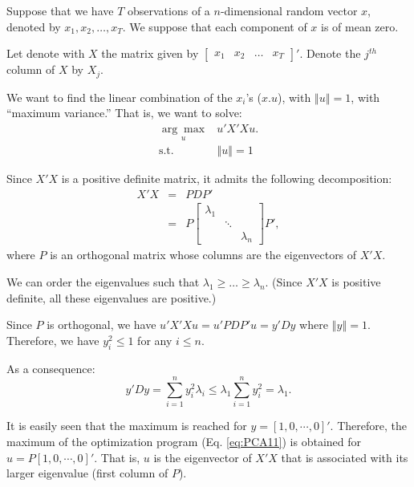 \documentclass[
  12pt,
]{book}
\theoremstyle{definition}
\theoremstyle{definition}
\theoremstyle{definition}
\theoremstyle{definition}
\theoremstyle{remark}
\begin{document}
Suppose that we have \(T\) observations of a \(n\)-dimensional random vector \(x\), denoted by \(x_{1},x_{2},\ldots,x_{T}\). We suppose that each component of \(x\) is of mean zero.

Let denote with \(X\) the matrix given by \(\left[\begin{array}{cccc}
x_{1} & x_{2} & \ldots & x_{T}\end{array}\right]'\). Denote the \(j^{th}\) column of \(X\) by \(X_{j}\).

We want to find the linear combination of the \(x_{i}\)'s (\(x.u\)), with \(\left\Vert u\right\Vert =1\), with ``maximum variance.'' That is, we want to solve:
\begin{equation}
\begin{array}{clll}
\underset{u}{\arg\max} & u'X'Xu. \\
\mbox{s.t. } & \left\Vert u \right\Vert =1
\end{array}\label{eq:PCA11}
\end{equation}

Since \(X'X\) is a positive definite matrix, it admits the following decomposition:
\begin{eqnarray*}
X'X & = & PDP'\\
& = & P\left[\begin{array}{ccc}
\lambda_{1}\\
& \ddots\\
&  & \lambda_{n}
\end{array}\right]P',
\end{eqnarray*}
where \(P\) is an orthogonal matrix whose columns are the eigenvectors of \(X'X\).

We can order the eigenvalues such that \(\lambda_{1}\geq\ldots\geq\lambda_{n}\). (Since \(X'X\) is positive definite, all these eigenvalues are positive.)

Since \(P\) is orthogonal, we have \(u'X'Xu=u'PDP'u=y'Dy\) where \(\left\Vert y\right\Vert =1\). Therefore, we have \(y_{i}^{2}\leq 1\) for any \(i\leq n\).

As a consequence:
\[
y'Dy=\sum_{i=1}^{n}y_{i}^{2}\lambda_{i}\leq\lambda_{1}\sum_{i=1}^{n}y_{i}^{2}=\lambda_{1}.
\]

It is easily seen that the maximum is reached for \(y=\left[1,0,\cdots,0\right]'\). Therefore, the maximum of the optimization program (Eq. \eqref{eq:PCA11}) is obtained for \(u=P\left[1,0,\cdots,0\right]'\). That is, \(u\) is the eigenvector of \(X'X\) that is associated with its larger eigenvalue (first column of \(P\)).
\end{document}
